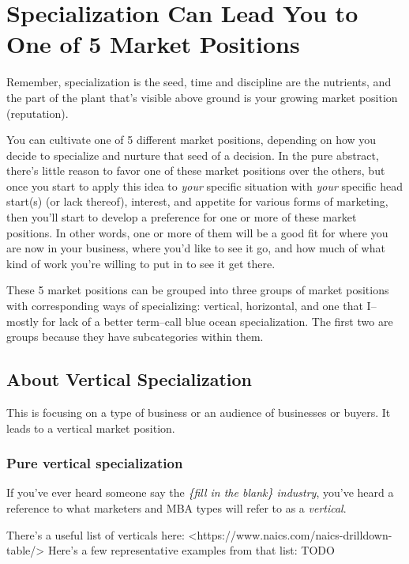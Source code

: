 \chapter{Specialization Can Lead You to One of 5 Market Positions}

Remember, specialization is the seed, time and discipline are the nutrients, and the part of the plant that's visible above ground is your growing market position (reputation).

You can cultivate one of 5 different market positions, depending on how you decide to specialize and nurture that seed of a decision. In the pure abstract, there's little reason to favor one of these market positions over the others, but once you start to apply this idea to \emph{your} specific situation with \emph{your} specific head start(s) (or lack thereof), interest, and appetite for various forms of marketing, then you'll start to develop a preference for one or more of these market positions. In other words, one or more of them will be a good fit for where you are now in your business, where you'd like to see it go, and how much of what kind of work you're willing to put in to see it get there.

These 5 market positions can be grouped into three groups of market positions with corresponding ways of specializing: vertical, horizontal, and one that I--mostly for lack of a better term--call blue ocean specialization. The first two are groups because they have subcategories within them.

\section{About Vertical Specialization}

This is focusing on a type of business or an audience of businesses or buyers. It leads to a vertical market position.

\subsection{Pure vertical specialization}

If you've ever heard someone say the \emph{\{fill in the blank\} industry}, you've heard a reference to what marketers and MBA types will refer to as a \emph{vertical}.

There's a useful list of verticals here: \textless{}https://www.naics.com/naics-drilldown-table/\textgreater{} Here's a few representative examples from that list: TODO

